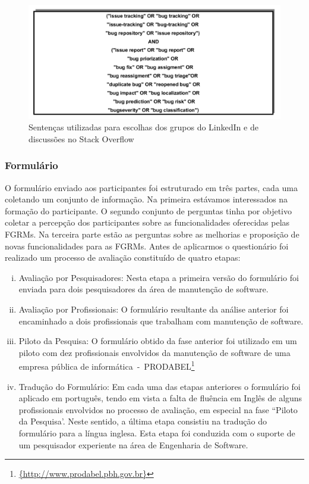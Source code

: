 \begin{figure}[htpb]
	\centering
	\includegraphics[width=0.7\linewidth]{./chapter-pesquisa-com-profissionais/img/setencas-grupos.pdf}
	\caption{Sentenças utilizadas para escolhas dos grupos do LinkedIn e de
		discussões no Stack Overflow}
\label{fig:setencas-grupos}
\end{figure}

\subsubsection{Formulário}
\label{subsubsec:questionario}

O formulário enviado aos participantes foi estruturado em três partes, cada uma
coletando um conjunto de informação. Na primeira estávamos interessados na
formação do participante. O segundo conjunto de perguntas tinha por objetivo
coletar a percepção dos participantes sobre as funcionalidades oferecidas pelas
FGRMs\@. Na terceira parte estão as perguntas sobre as melhorias e proposição de
novas funcionalidades para as FGRMs. Antes de aplicarmos o questionário foi
realizado um processo de avaliação constituído de quatro etapas:

\begin{enumerate}[(i)]
	\item Avaliação por Pesquisadores: Nesta etapa a primeira versão do
		formulário foi enviada para dois pesquisadores da área de manutenção de
		software.
	\item Avaliação por Profissionais: O formulário resultante da análise
		anterior foi encaminhado a dois profissionais que trabalham com
		manutenção de software.
	\item Piloto da Pesquisa: O formulário obtido da fase anterior foi utilizado
		em um piloto com dez profissionais envolvidos da manutenção de software
		de uma empresa pública de
		informática~-~PRODABEL\footnote{\url{{http://www.prodabel.pbh.gov.br}}}
	\item Tradução do Formulário: Em cada uma das etapas anteriores o
		formulário foi aplicado em português, tendo em vista a falta de fluência
		em Inglês de alguns profissionais envolvidos no processo de avaliação,
		em especial na fase ``Piloto da Pesquisa'. Neste sentido, a última etapa
		consistiu na tradução do formulário para a língua inglesa. Esta etapa
		foi conduzida com  o suporte de um pesquisador experiente na área de
		Engenharia de Software.
\end{enumerate}

